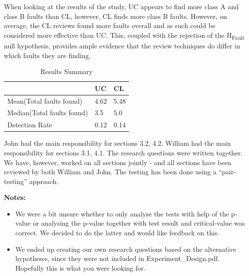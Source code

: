 \documentclass[10pt,twocolumn]{article}
\begin{document}
When looking at the results of the study, UC appears to find more class A and class B faults than CL, however, CL finds more class B faults. However, on average, the CL reviews found more faults overall and as such could be considered more effective than UC. This, coupled with the rejection of the H\textsubscript{Fault} null hypothesis, provides ample evidence that the review techniques do differ in which faults they are finding. 

\begin{table}
	\centering
	\begin{tabular}[ht]{|l|l|l|}
	\hline
	& UC & CL \\
	\hline
	Mean(Total faults found) & 4.62 & 5.48 \\
	\hline
	Median(Total faults found) & 3.5 & 5.0 \\
	\hline
	Detection Rate & 0.12 & 0.14 \\
	\hline
	\end{tabular}
	\caption{Results Summary}
\end{table}







John had the main responsibility for sections 3.2, 4.2. William had the main responsibility for sections 3.1, 4.1. The research questions were written together. We have, however, worked on all sections jointly - and all sections have been reviewed by both William and John. The testing has been done using a ``pair-testing'' approach. \newline


\noindent
\textbf{Notes:}
\begin{itemize}
\item We were a bit unsure whether to only analyse the tests with help of the p-value or analysing the p-value together with test result and critical-value was correct. We decided to do the latter and would like feedback on this. 
\item We ended up creating our own research questions based on the alternative hypotheses, since they were not included in Experiment\_Design.pdf. Hopefully this is what you were looking for.
\end{itemize}
\end{document}
